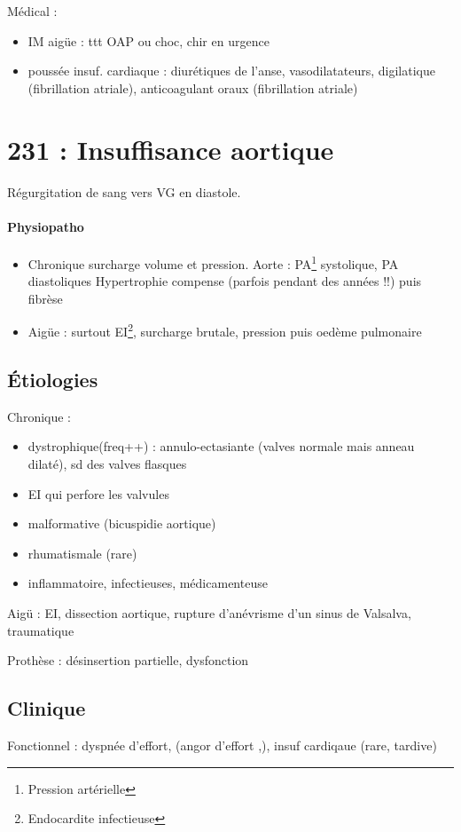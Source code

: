 Médical :
\begin{itemize}
  \item IM aigüe : ttt OAP ou choc, chir en urgence
  \item poussée insuf. cardiaque : diurétiques de l'anse, vasodilatateurs,
    digilatique (fibrillation atriale), anticoagulant oraux (fibrillation
    atriale)
\end{itemize}


\section{231 : Insuffisance aortique}%
\label{sec:231_insuffisance_aortique}
Régurgitation de sang vers VG en diastole.

\paragraph{Physiopatho} 
\begin{itemize}
  \item Chronique
surcharge volume et pression. Aorte : \inc
PA\footnote{Pression artérielle}
systolique, \dec PA diastoliques
Hypertrophie compense (parfois pendant des années !!) puis fibrèse
\item Aigüe : surtout EI\footnote{Endocardite infectieuse}, surcharge brutale,
  \inc pression puis oedème pulmonaire
\end{itemize}

\subsection{Étiologies}
Chronique :
\begin{itemize}
  \item dystrophique(freq++) : annulo-ectasiante (valves normale mais anneau
    dilaté), sd des valves flasques
  \item EI qui perfore les valvules
  \item malformative (bicuspidie aortique)
  \item rhumatismale (rare)
  \item inflammatoire, infectieuses, médicamenteuse
\end{itemize}
Aigü : EI, dissection aortique, rupture d'anévrisme d'un sinus de Valsalva,
traumatique

Prothèse : désinsertion partielle, dysfonction

\subsection{Clinique}
Fonctionnel : dyspnée d'effort, (angor d'effort ,), insuf cardiqaue (rare,
tardive)

